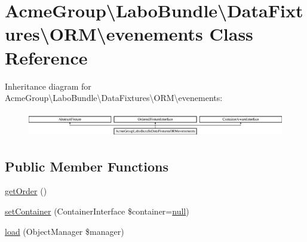 \hypertarget{class_acme_group_1_1_labo_bundle_1_1_data_fixtures_1_1_o_r_m_1_1evenements}{\section{Acme\+Group\textbackslash{}Labo\+Bundle\textbackslash{}Data\+Fixtures\textbackslash{}O\+R\+M\textbackslash{}evenements Class Reference}
\label{class_acme_group_1_1_labo_bundle_1_1_data_fixtures_1_1_o_r_m_1_1evenements}
}
Inheritance diagram for Acme\+Group\textbackslash{}Labo\+Bundle\textbackslash{}Data\+Fixtures\textbackslash{}O\+R\+M\textbackslash{}evenements\+:\begin{figure}[H]
\begin{center}
\leavevmode
\includegraphics[height=1.107814cm]{class_acme_group_1_1_labo_bundle_1_1_data_fixtures_1_1_o_r_m_1_1evenements}
\end{center}
\end{figure}
\subsection*{Public Member Functions}
\begin{DoxyCompactItemize}
\item 
\hyperlink{class_acme_group_1_1_labo_bundle_1_1_data_fixtures_1_1_o_r_m_1_1evenements_ae5a5643d0855bd1a1cabaf9f50f9c6dc}{get\+Order} ()
\item 
\hyperlink{class_acme_group_1_1_labo_bundle_1_1_data_fixtures_1_1_o_r_m_1_1evenements_a829c6238357eacdca602e4a37a8b0a7c}{set\+Container} (Container\+Interface \$container=\hyperlink{validate_8js_afb8e110345c45e74478894341ab6b28e}{null})
\item 
\hyperlink{class_acme_group_1_1_labo_bundle_1_1_data_fixtures_1_1_o_r_m_1_1evenements_a9b092e57ff036df0ee1fd80d6c595db3}{load} (Object\+Manager \$manager)
\end{DoxyCompactItemize}


